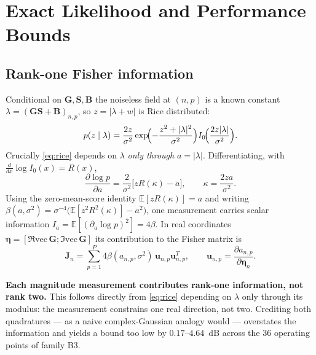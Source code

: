 \documentclass[journal]{IEEEtran}
\newcommand{\bG}{\mathbf{G}}
\newcommand{\bS}{\mathbf{S}}
\newcommand{\bB}{\mathbf{B}}
\newcommand{\bJ}{\mathbf{J}}
\begin{document}
\section{Exact Likelihood and Performance Bounds}\label{sec:crlb}

\subsection{Rank-one Fisher information}

Conditional on $\bG,\bS,\bB$ the noiseless field at $(n,p)$ is a known constant
$\lambda=(\bG\bS+\bB)_{n,p}$, so $z=|\lambda+w|$ is Rice distributed:
\begin{equation}\label{eq:rice}
p(z\mid\lambda)=\frac{2z}{\sigma^2}
\exp\!\Bigl(-\frac{z^2+|\lambda|^2}{\sigma^2}\Bigr)
I_0\!\Bigl(\frac{2z|\lambda|}{\sigma^2}\Bigr).
\end{equation}
Crucially \eqref{eq:rice} depends on $\lambda$ \emph{only through}
$a=|\lambda|$. Differentiating, with $\frac{d}{dx}\log I_0(x)=R(x)$,
\begin{equation}\label{eq:score}
\frac{\partial\log p}{\partial a}=\frac{2}{\sigma^2}\bigl[zR(\kappa)-a\bigr],
\qquad \kappa=\frac{2za}{\sigma^2}.
\end{equation}
Using the zero-mean-score identity $\mathbb{E}[zR(\kappa)]=a$ and writing
$\beta(a,\sigma^2)=\sigma^{-4}\bigl(\mathbb{E}[z^{2}R^{2}(\kappa)]-a^{2}\bigr)$,
one measurement carries scalar information
$I_a=\mathbb{E}[(\partial_a\log p)^2]=4\beta$. In real coordinates
$\boldsymbol{\eta}=[\Re\mathrm{vec}\,\bG;\Im\mathrm{vec}\,\bG]$ its
contribution to the Fisher matrix is
\begin{equation}\label{eq:fisher}
\bJ_{n}=\sum_{p=1}^{P}4\beta(a_{n,p},\sigma^2)\,
\mathbf{u}_{n,p}\mathbf{u}_{n,p}^{T},
\qquad
\mathbf{u}_{n,p}=\frac{\partial a_{n,p}}{\partial\boldsymbol{\eta}_n}.
\end{equation}

\textbf{Each magnitude measurement contributes rank-one information, not rank
two.} This follows directly from \eqref{eq:rice} depending on $\lambda$ only
through its modulus: the measurement constrains one real direction, not two.
Crediting both quadratures --- as a naive complex-Gaussian analogy would ---
overstates the information and yields a bound too low by
$0.17$--$4.64$~dB across the $36$ operating points of family B3.
\end{document}
